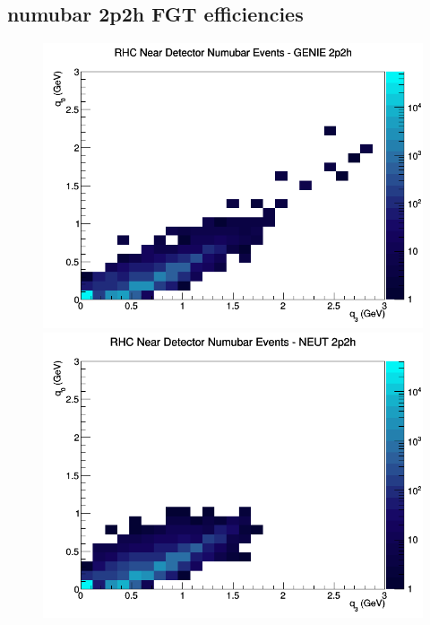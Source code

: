 \subsection{numubar 2p2h FGT efficiencies}
\begin{figure}[h]
\includegraphics[width=\linewidth]{eff_q0_q3/FGT/2p2h_RHC_ND_numubar_q3_q0_GENIE.png}
\endminipage
{}
\includegraphics[width=\linewidth]{eff_q0_q3/FGT/2p2h_RHC_ND_numubar_q3_q0_NEUT.png}
\endminipage
{}

\end{figure}
